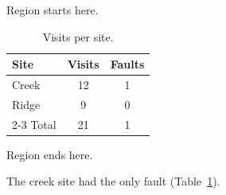 \documentclass[11pt]{article}
\begin{document}
Region starts here.

\begin{table}[ht]
\centering
\caption{Visits per site.}\label{tab:visits}
\begin{tabular}{lcc}
\hline
\rowcolor{gray!20} Site & Visits & Faults \\
\hline
Creek & 12 & 1 \\
Ridge & 9 & 0 \\
\cline{2-3}
Total & 21 & 1 \\
\hline
\end{tabular}
\end{table}

Region ends here.

The creek site had the only fault (Table~\ref{tab:visits}).
\end{document}
